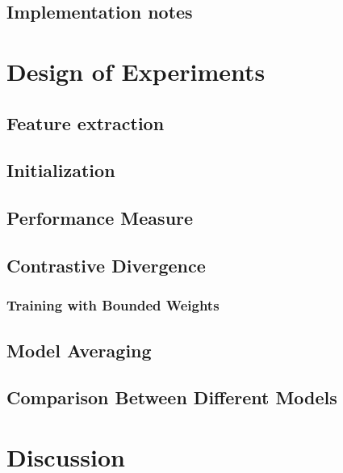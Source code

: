 \documentclass[twoside,12pt]{article}
\begin{document}
\subsection{ Implementation notes}

\section{Design of Experiments}


\subsection{Feature extraction}

\subsection{Initialization}

\subsection{Performance Measure}


\subsection{Contrastive Divergence}

\subsubsection{Training with Bounded Weights}


\subsection{Model Averaging}


\subsection{Comparison Between Different Models}


\section{Discussion}


\begin{thebibliography}{9}


\end{thebibliography}
\end{document}
